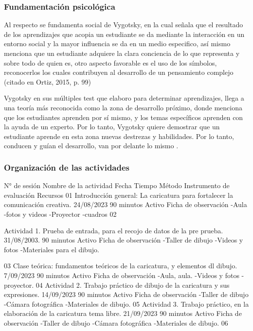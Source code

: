 \documentclass[12pt,a4paper]{article}
\begin{document}
\subsubsection{Fundamentación psicológica}

Al respecto se fundamenta  social de Vygotsky, en la cual señala que el resultado de los aprendizajes que acopia un estudiante se da mediante la interacción en un entorno social y la mayor influencia se da en un medio especifico, así mismo menciona que un estudiante adquiere la clara conciencia de lo que representa y sobre todo de quien es, otro aspecto favorable es el uso de los símbolos, reconocerlos los cuales contribuyen al desarrollo de un pensamiento complejo (citado en Ortiz, 2015, p. 99)

Vygotsky en sus múltiples test que elaboro para determinar aprendizajes, llega a una teoría más reconocida como la zona de desarrollo próximo, donde menciona que los estudiantes aprenden por sí mismo, y los temas específicos aprenden con la ayuda de un experto. Por lo tanto, Vygotsky quiere demostrar que un estudiante aprende en esta zona nuevas destrezas y habilidades. Por lo tanto, conducen y guían el desarrollo, van por delante lo mismo .

\subsubsection{Organización de las actividades}
N° de sesión
Nombre de la actividad
Fecha
Tiempo
Método
Instrumento de evaluación
Recursos
01
Introducción general: La caricatura para fortalecer la comunicación creativa.
24/08/2023
90 minutos
Activo
Ficha de observación
-Aula 
-fotos y videos 
-Proyector
-cuadros
02

Actividad 1.
Prueba de entrada, para el recojo de datos de la pre prueba.
31/08/2003.
90 minutos 
Activo
Ficha de observación 
-Taller de dibujo
-Videos y fotos
-Materiales para el dibujo.

03
Clase teórica: fundamentos teóricos de la caricatura, y elementos dl dibujo.
7/09/2023
90 minutos 
Activo
Ficha de observación 
-Aula, aula.
-Videos y fotos
- proyector.
04
Actividad 2.
Trabajo práctico de dibujo de la caricatura y sus expresiones. 
14/09/2023
90 minutos 
Activo
Ficha de observación 
-Taller de dibujo
-Cámara fotográfica
-Materiales de dibujo.
05
Actividad 3.
Trabajo práctico, en la elaboración de la caricatura tema libre.
21/09/2023
90 minutos 
Activo
Ficha de observación 
-Taller de dibujo
-Cámara fotográfica
-Materiales de dibujo.
06
\end{document}
